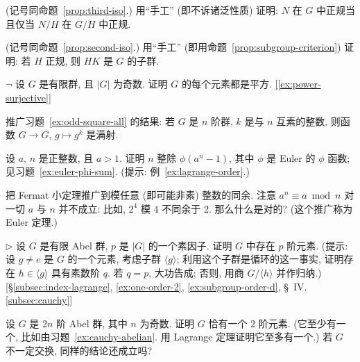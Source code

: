 \begin{prob}
\label{ex:third-iso-by-hand}
(记号同命题~\ref{prop:third-iso}.) 用``手工'' (即不诉诸泛性质) 证明: $N$ 在 $G$ 中正规当且仅当 $N/H$ 在 $G/H$ 中正规.
\end{prob}

\begin{prob}
\label{ex:second-iso-by-hand}
(记号同命题~\ref{prop:second-iso}.) 用``手工'' (即用命题~\ref{prop:subgroup-criterion}) 证明: 若 $H$ 正规, 则 $HK$ 是 $G$ 的子群.
\end{prob}

\begin{prob}
\label{ex:odd-square-all}
$\neg$ 设 $G$ 是有限群, 且 $|G|$ 为奇数. 证明 $G$ 的每个元素都是平方. [\ref{ex:power-surjective}]
\end{prob}

\begin{prob}
\label{ex:power-surjective}
推广习题~\ref{ex:odd-square-all} 的结果: 若 $G$ 是 $n$ 阶群, $k$ 是与 $n$ 互素的整数, 则函数 $G \rightarrow G$, $g \mapsto g^k$ 是满射.
\end{prob}

\begin{prob}
\label{ex:phi-an}
设 $a$, $n$ 是正整数, 且 $a>1$. 证明 $n$ 整除 $\phi(a^n - 1)$, 其中 $\phi$ 是 Euler 的 $\phi$ 函数; 见习题~\ref{ex:euler-phi-sum}. (提示: 例~\ref{ex:lagrange-order}.)
\end{prob}

\begin{prob}
\label{ex:euler-theorem}
把 Fermat 小定理推广到模任意 (即可能非素) 整数的同余. 注意 $a^n \equiv a \bmod n$ 对一切 $a$ 与 $n$ 并不成立: 比如, $2^4$ 模 $4$ 不同余于 $2$. 那么什么是对的? (这个推广称为 Euler 定理.)
\end{prob}

\begin{prob}
\label{ex:cauchy-abelian}
$\triangleright$ 设 $G$ 是有限 Abel 群, $p$ 是 $|G|$ 的一个素因子. 证明 $G$ 中存在 $p$ 阶元素. (提示: 设 $g \neq e$ 是 $G$ 的一个元素, 考虑子群 $\langle g \rangle$; 利用这个子群是循环的这一事实, 证明存在 $h \in \langle g \rangle$ 具有素数阶 $q$. 若 $q = p$, 大功告成; 否则, 用商 $G/\langle h \rangle$ 并作归纳.) [\S\ref{subsec:index-lagrange}, \ref{ex:one-order-2}, \ref{ex:subgroup-order-d}, \S~IV.\ref{subsec:cauchy}]
\end{prob}

\begin{prob}
\label{ex:one-order-2}
设 $G$ 是 $2n$ 阶 Abel 群, 其中 $n$ 为奇数. 证明 $G$ 恰有一个 $2$ 阶元素. (它至少有一个, 比如由习题~\ref{ex:cauchy-abelian}. 用 Lagrange 定理证明它至多有一个.) 若 $G$ 不一定交换, 同样的结论还成立吗?
\end{prob}

